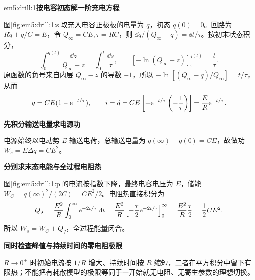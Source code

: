 \LectureAnswerSection

\begin{drillsolution}{em5:drill:1}\textbf{按电容初态解一阶充电方程}\par\nobreak
图\ref{fig:em5:drill:1:s}取充入电容正极板的电量为 $q$，初态 $q(0)=0$。回路为 $R\dot q+q/C=E$，令 $Q_\infty=CE,\tau=RC$，则 $\dd q/(Q_\infty-q)=\dd t/\tau$。按初末状态积分，
\[
\int_0^{q(t)}\frac{\dd z}{Q_\infty-z}
=\int_0^t\frac{\dd s}{\tau},\qquad
[-\ln(Q_\infty-z)]_0^{q(t)}=\frac t\tau.
\]
原函数的负号来自内层 $Q_\infty-z$ 的导数 $-1$，所以 $-\ln[(Q_\infty-q)/Q_\infty]=t/\tau$，从而
\[
 q=CE(1-\mathrm e^{-t/\tau}),\qquad
 i=\dot q=CE\left[-\mathrm e^{-t/\tau}\left(-\frac1\tau\right)\right]
 =\frac ER\mathrm e^{-t/\tau}.
\]


\par\medskip{}\noindent\textbf{先积分输送电量求电源功}\par\nobreak
电源始终以电动势 $E$ 输送电荷，总输送电量为 $q(\infty)-q(0)=CE$，故做功 $W_s=E\Delta q=CE^2$。



\par\medskip{}\noindent\textbf{分别求末态电能与全过程电阻热}\par\nobreak
图\ref{fig:em5:drill:1:p}的电流按指数下降，最终电容电压为 $E$，储能 $W_C=q(\infty)^2/(2C)=CE^2/2$。电阻热直接积分为
\[Q_J=\frac{E^2}{R}\int_0^\infty\mathrm e^{-2t/\tau}\mathop{}\!\mathrm d t
=\frac{E^2}{R}\left[-\frac\tau2\mathrm e^{-2t/\tau}\right]_0^\infty
=\frac{E^2}{R}\frac\tau2=\frac12CE^2.\]
所以 $W_s=W_C+Q_J$，全过程能量闭合。

\par\medskip{}\noindent\textbf{同时检查峰值与持续时间的零电阻极限}\par\nobreak
$R\to0^+$ 时初始电流按 $1/R$ 增大、持续时间按 $R$ 缩短，二者在平方积分中留下有限热；不能把有耗散模型的极限等同于一开始就无电阻、无寄生参数的理想切换。\end{drillsolution}
